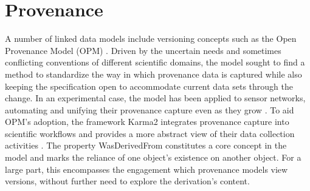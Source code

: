 \section{Provenance}

A number of linked data models include versioning concepts such as the Open Provenance Model (OPM) \cite{moreau2008open}.
Driven by the uncertain needs and sometimes conflicting conventions of different scientific domains, the model sought to find a method to standardize the way in which provenance data is captured while also keeping the specification open to accommodate current data sets through the change.
In an experimental case, the model has been applied to sensor networks, automating and unifying their provenance capture even as they grow \cite{5478496}.
To aid OPM's adoption, the framework Karma2 integrates provenance capture into scientific workflows and provides a more abstract view of their data collection activities \cite{simmhan2010karma2}.
The property WasDerivedFrom constitutes a core concept in the model and marks the reliance of one object's existence on another object.
For a large part, this encompasses the engagement which provenance models view versions, without further need to explore the derivation's content.

